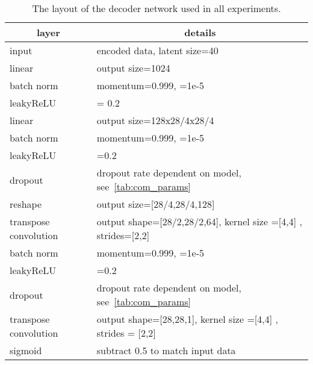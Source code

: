 \documentclass[10pt]{article} \usepackage[accepted]{tmlr}
\begin{document}
\begin{table}[h]
{\begin{tabular}{ll}
\multicolumn{1}{c|}{\textbf{layer}}        & \multicolumn{1}{c}{\textbf{details}}                                             \\ \hline
\multicolumn{1}{l|}{input}                 & encoded data, latent size=40 \\
\multicolumn{1}{l|}{linear}                & output size=1024                                                               \\
\multicolumn{1}{l|}{batch norm}             & momentum=0.999, =1e-5                                                   \\
\multicolumn{1}{l|}{leakyReLU}             & = 0.2                                                                       \\
\multicolumn{1}{l|}{linear}                & output size=128x28/4x28/4                                                    \\
\multicolumn{1}{l|}{batch norm}             & momentum=0.999, =1e-5                                                   \\
\multicolumn{1}{l|}{leakyReLU}             & =0.2                                                                       \\
\multicolumn{1}{l|}{dropout}               & dropout rate dependent on model, see~\ref{tab:com_params}                                                               \\
\multicolumn{1}{l|}{reshape}               & output size={[}28/4,28/4,128{]}                                              \\
\multicolumn{1}{l|}{transpose convolution} & output shape={[}28/2,28/2,64{]}, kernel size ={[}4,4{]} , strides={[}2,2{]} \\
\multicolumn{1}{l|}{batch norm}             & momentum=0.999, =1e-5                                                   \\
\multicolumn{1}{l|}{leakyReLU}             & =0.2                                                                       \\
\multicolumn{1}{l|}{dropout}               & dropout rate dependent on model, see~\ref{tab:com_params}                                                   \\
\multicolumn{1}{l|}{transpose convolution} & output shape={[}28,28,1{]}, kernel size ={[}4,4{]} , strides = {[}2,2{]}        \\
\multicolumn{1}{l|}{sigmoid}               & subtract 0.5 to match input data                                                
\end{tabular}}
\caption{\label{tab:dec_archi} The layout of the decoder network used in all experiments.}
\end{table}
\end{document}
